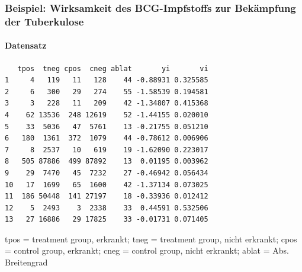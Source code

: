 \begin{frame}
  \frametitle{Beispiel: Wirksamkeit des BCG-Impfstoffs zur Bekämpfung der
    Tuberkulose} \framesubtitle{Datensatz}

  \begin{footnotesize}
\begin{knitrout}
\color{fgcolor}\begin{kframe}
\begin{verbatim}
   tpos  tneg cpos  cneg ablat       yi       vi
1     4   119   11   128    44 -0.88931 0.325585
2     6   300   29   274    55 -1.58539 0.194581
3     3   228   11   209    42 -1.34807 0.415368
4    62 13536  248 12619    52 -1.44155 0.020010
5    33  5036   47  5761    13 -0.21755 0.051210
6   180  1361  372  1079    44 -0.78612 0.006906
7     8  2537   10   619    19 -1.62090 0.223017
8   505 87886  499 87892    13  0.01195 0.003962
9    29  7470   45  7232    27 -0.46942 0.056434
10   17  1699   65  1600    42 -1.37134 0.073025
11  186 50448  141 27197    18 -0.33936 0.012412
12    5  2493    3  2338    33  0.44591 0.532506
13   27 16886   29 17825    33 -0.01731 0.071405
\end{verbatim}
\end{kframe}
\end{knitrout}


tpos = treatment group, erkrankt; tneg = treatment group, nicht erkrankt; cpos =
control group, erkrankt; cneg = control group, nicht erkrankt; ablat =
Abs. Breitengrad
  \end{footnotesize}
\end{frame}



